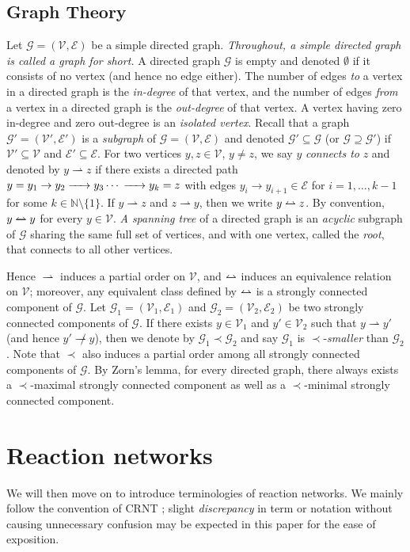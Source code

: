 \documentclass[10pt]{amsart}
\numberwithin{equation}{section}
\theoremstyle{plain}
\theoremstyle{definition}
\theoremstyle{remark}
\newcommand{\cE}{\mathcal{E}}
\newcommand{\cG}{\mathcal{G}}
\newcommand{\cV}{\mathcal{V}}
\newcommand{\leftrightharpoonup}{%
  \mathrel{\mathpalette\lrhup\relax}%
}
\newcommand{\lrhup}[2]{%
  \ooalign{$#1\leftharpoonup$\cr$#1\rightharpoonup$\cr}%
}
\begin{document}
\subsection{Graph Theory}

Let $\cG=(\cV,\cE)$ be a simple directed graph. \emph{Throughout, a simple directed graph is called a graph for short.} A directed graph $\cG$ is empty and denoted
$\emptyset$ if it consists of no vertex (and hence no edge either). The number of edges \emph{to} a vertex in a directed graph is the \emph{in-degree} of that vertex, and the number of edges \emph{from} a vertex in a directed graph is the \emph{out-degree} of that vertex. A vertex having zero in-degree and zero out-degree is an \emph{isolated vertex}.  Recall that a graph $\mathcal{G}'=(\cV',\cE')$ is a \emph{subgraph} of $\cG=(\cV,\cE)$ and denoted $\cG'\subseteq\cG$ (or $\cG\supseteq\cG'$) if $\cV' \subseteq \cV$ and $\cE' \subseteq \cE$. For two vertices $y,z\in\cV$, $y\neq z$,  we say $y$ \emph{connects to} $z$ and denoted by $y\rightharpoonup z$ if there exists a directed path $y=y_1\to y_2\ce{->[]} y_3\cdots \ce{->[]} y_k=z$ with edges $y_i\to y_{i+1}\in\cE$ for $i=1,\ldots,k-1$ for some $k\in\mathbb{N}\setminus\{1\}$. If $y\rightharpoonup z$ and $z \rightharpoonup y$, then we write $y \leftrightharpoonup z$. By convention, $y\leftrightharpoonup y$ for every $y\in\cV$. \emph{A spanning tree} of a directed graph is an \emph{acyclic} subgraph  of $\cG$ sharing the same full set of vertices, and with one  vertex, called the \emph{root}, that connects to all other vertices.

Hence $\rightharpoonup$ induces a partial order on $\cV$, and $\leftrightharpoonup$ induces an equivalence relation on $\cV$; moreover,  any equivalent class defined by $\leftrightharpoonup$ is a strongly connected component of $\cG$. Let  $\cG_1=(\cV_1,\cE_1)$ and $\cG_2=(\cV_2,\cE_2)$ be  two strongly connected components of $\cG$. If there exists $y\in\cV_1$ and $y'\in\cV_2$ such that $y\rightharpoonup y'$
(and hence $y'\not\rightharpoonup y$), then we denote by $\cG_1\prec \cG_2$ and say $\cG_1$ is $\prec$-\emph{smaller} than $\cG_2$. Note that $\prec$ also induces a partial order among all strongly connected components of $\cG$. By Zorn's lemma, for every directed graph, there always exists a $\prec$-maximal strongly connected component as well as a $\prec$-minimal strongly connected component.

\section{Reaction networks}\label{sect:RN}
We will then move on to introduce terminologies of reaction networks. We mainly follow the convention of  CRNT \cite{F19}; slight \emph{discrepancy} in term or notation  without causing unnecessary confusion may be expected in this paper for the ease of exposition.
\end{document}
